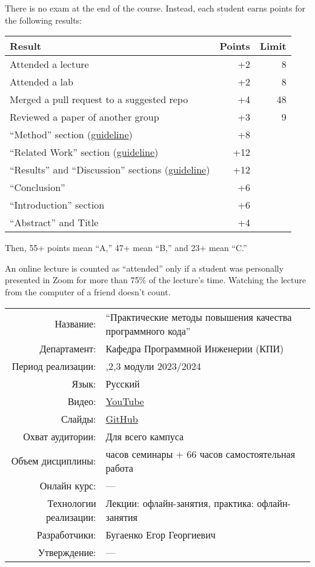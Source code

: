 \documentclass[nobrand,anonymous,nodate,nosecurity]{huawei}
\begin{document}
{There is no exam at the end of the course. Instead,
each student earns points for the following results:\\
\renewcommand{\arraystretch}{1}
\begin{tabular}{lrr}
Result & Points & Limit \\
\hline
Attended a lecture & +2 & 8 \\
Attended a lab & +2 & 8 \\
Merged a pull request to a suggested repo & +4 & 48 \\
Reviewed a paper of another group & +3 & 9 \\
``Method'' section (\href{https://www.yegor256.com/2023/10/11/method-of-research.html}{guideline}) & +8 \\
``Related Work'' section (\href{https://www.yegor256.com/2023/09/29/how-to-write-related-work-section.html}{guideline}) & +12 \\
``Results'' and ``Discussion'' sections (\href{https://www.yegor256.com/2023/12/11/results-and-discussion.html}{guideline}) & +12 \\
``Conclusion'' & +6 \\
``Introduction'' section & +6 \\
``Abstract'' and Title & +4 \\
\end{tabular}

Then, 55+ points mean ``A,'' 47+ mean ``B,'' and 23+ mean ``C.''

An online lecture is counted as ``attended'' only if a student was personally
presented in Zoom for more than 75\% of the lecture's time. Watching the
lecture from the computer of a friend doesn't count.

\else

\newcommand\head[2]{#1: & #2 \\}
\begin{tabularx}{\textwidth}{r>{\raggedright\arraybackslash}X}
\head{Название}
  {``Практические методы повышения качества программного кода''}
\head{Департамент}
  {Кафедра Программной Инженерии (КПИ)}
\head{Период реализации}
  {1,2,3 модули 2023/2024}
\head{Язык}
  {Русский}
\head{Видео}
  {\href{https://www.youtube.com/playlist?list=PLaIsQH4uc08xyXRhhYPHh-Yam2kEwNaLl}{YouTube}}
\head{Слайды}
  {\href{https://github.com/yegor256/sqm}{GitHub}}
\head{Охват аудитории}
  {Для всего кампуса}
\head{Объем дисциплины}
  {48 часов семинары + 66 часов самостоятельная работа}
\head{Онлайн курс}
  {---}
\head{Технологии реализации}
  {Лекции: офлайн-занятия, практика: офлайн-занятия}
\head{Разработчики}
  {Бугаенко Егор Георгиевич}
\head{Утверждение}
  {---}
\end{tabularx}

}
\end{document}
